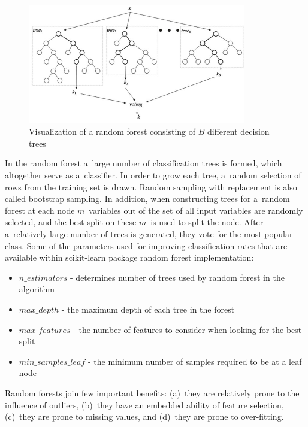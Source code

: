 \begin{figure}[htp]
	\centering
	\includegraphics[width=0.85\textwidth]{Figures/rf_visualization.jpg}
	\caption{Visualization of a random forest consisting of $B$ different decision trees}
	\label{fig:rf_visualization}\vspace{-3pt}
\end{figure}

In the random forest a~large number of classification trees is formed, which altogether serve as a~classifier. In order to grow each tree, a~random selection of rows from the training set is drawn. Random sampling with replacement is also called bootstrap sampling. In addition, when constructing trees for a~random forest at each node $m$~variables out of the set of all input variables are randomly selected, and the best split on these $m$~is used to split the node. After a~relatively large number of trees is generated, they vote for the most popular class. Some of the parameters used for improving classification rates that are available within scikit-learn package random forest implementation:

\begin{itemize}
	\item $n\_estimators$ - determines number of trees used by random forest in the algorithm
	\item $max\_depth$ - the maximum depth of each tree in the forest
	\item $max\_features$ - the number of features to consider when looking for the best split
	\item $min\_samples\_leaf$ - the minimum number of samples required to be at a leaf node
\end{itemize}

Random forests join few important benefits: (a)~they are relatively prone to the influence of outliers, (b)~they have an embedded ability of feature selection, (c)~they are prone to missing values, and (d)~they are prone to over-fitting.

